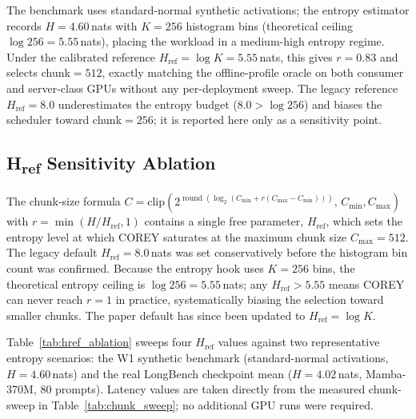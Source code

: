 The benchmark uses standard-normal synthetic activations; the entropy estimator records $H{=}4.60$\,nats with $K{=}256$ histogram bins (theoretical ceiling $\log 256{=}5.55$\,nats), placing the workload in a medium-high entropy regime. Under the calibrated reference $H_{\text{ref}}{=}\log K{=}5.55$\,nats, this gives $r{=}0.83$ and selects chunk$=512$, exactly matching the offline-profile oracle on both consumer and server-class GPUs without any per-deployment sweep. The legacy reference $H_{\text{ref}}{=}8.0$ underestimates the entropy budget ($8.0 > \log 256$) and biases the scheduler toward chunk$=256$; it is reported here only as a sensitivity point.


\subsection{H\textsubscript{ref} Sensitivity Ablation}
\label{sec:href_ablation}

The chunk-size formula $C = \mathrm{clip}(2^{\operatorname{round}(\log_2(C_{\min} + r(C_{\max}-C_{\min})))},\,C_{\min},C_{\max})$ with $r = \min(H/H_{\text{ref}},1)$ contains a single free parameter, $H_{\text{ref}}$, which sets the entropy level at which COREY saturates at the maximum chunk size $C_{\max}=512$.
The legacy default $H_{\text{ref}}{=}8.0$\,nats was set conservatively before the histogram bin count was confirmed. Because the entropy hook uses $K{=}256$ bins, the theoretical entropy ceiling is $\log 256{=}5.55$\,nats; any $H_{\text{ref}}{>}5.55$ means COREY can never reach $r{=}1$ in practice, systematically biasing the selection toward smaller chunks. The paper default has since been updated to $H_{\text{ref}}{=}\log K$.

Table~\ref{tab:href_ablation} sweeps four $H_{\text{ref}}$ values against two representative entropy scenarios: the W1 synthetic benchmark (standard-normal activations, $H{=}4.60$\,nats) and the real LongBench checkpoint mean ($H{=}4.02$\,nats, Mamba-370M, 80 prompts). Latency values are taken directly from the measured chunk-sweep in Table~\ref{tab:chunk_sweep}; no additional GPU runs were required.


